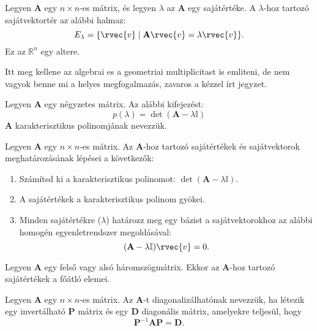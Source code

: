 \documentclass[a4paper, 12pt]{scrartcl}
\begin{document}
\begin{definition}[Sajátaltér]
  Legyen \( \textbf{A} \) egy \( n \times n \)-es mátrix, és legyen \( \lambda \) az \( \textbf{A} \) egy sajátértéke. A \( \lambda \)-hoz tartozó sajátvektortér az alábbi halmaz:
  \[
    E_\lambda = \{ \rvec{v} \mid \textbf{A}\rvec{v} = \lambda\rvec{v} \}.
  \]
  Ez az \( \mathbb{R}^n \) egy altere.
\end{definition}

Itt meg kellene az algebrai es a geometriai multiplicitast is emliteni, de nem vagyok benne mi a helyes megfogalmazás, zavaros a kézzel írt jegyzet.

\begin{definition}
  Legyen \( \textbf{A} \) egy négyzetes mátrix. Az alábbi kifejezést:
  \[
    p(\lambda) = \det(\textbf{A} - \lambda \mathbb{I})
  \]
  \( \textbf{A} \) karakterisztikus polinomjának nevezzük.
\end{definition}

\begin{blueBox}
  Legyen \( \textbf{A} \) egy \( n \times n \)-es mátrix. Az \( \textbf{A} \)-hoz tartozó sajátértékek és sajátvektorok meghatározásának lépései a következők:
  \begin{enumerate}
    \item Számítsd ki a karakterisztikus polinomot: \( \det(\textbf{A} - \lambda \mathbb{I}) \).
    \item A sajátértékek a karakterisztikus polinom gyökei.
    \item Minden sajátértékre (\( \lambda \)) határozz meg egy bázist a sajátvektorokhoz az alábbi homogén egyenletrendszer megoldásával:
          \[
            (\textbf{A} - \lambda \mathbb{I})\rvec{v} = 0.
          \]
  \end{enumerate}
\end{blueBox}

\begin{note}
  Legyen \( \textbf{A} \) egy felső vagy alsó háromszögmátrix. Ekkor az \( \textbf{A} \)-hoz tartozó sajátértékek a főátló elemei.
\end{note}

\begin{definition}
  Legyen \( \textbf{A} \) egy \( n \times n \)-es mátrix. Az \( \textbf{A} \)-t diagonalizálhatónak nevezzük, ha létezik egy invertálható \( \textbf{P} \) mátrix és egy \( \textbf{D} \) diagonális mátrix, amelyekre teljesül, hogy
  \[
    \textbf{P}^{-1}\textbf{AP} = \textbf{D}.
  \]
\end{definition}
\end{document}
